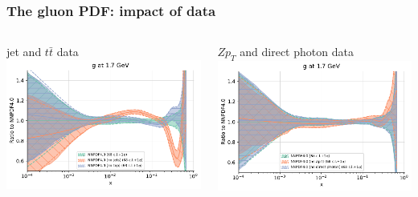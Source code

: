 \documentclass{beamer}
\begin{document}
\begin{frame}
 \frametitle{The gluon PDF: impact of data}
 \footnotesize
 \centering
 \vspace{0.1cm}
 \begin{columns}[c]
  \begin{column}{0.5\textwidth}
   \centering
   jet and $t\bar{t}$ data\\
   \includegraphics[width=\columnwidth]{plots/gluon_1}\\
  \end{column}
  \begin{column}{0.5\textwidth}
   \centering
   $Zp_T$ and direct photon data\\
   \includegraphics[width=\columnwidth]{plots/gluon_2}\\ 

\end{column}
\end{columns}
\end{frame}
\end{document}
